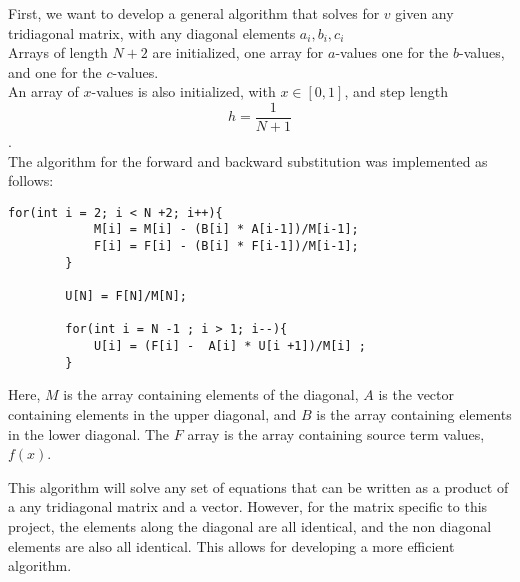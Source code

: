 \documentclass[12pt]{article}
\begin{document}
   
 First, we want to develop a general algorithm that solves for $v$ given any tridiagonal matrix, with any diagonal elements $a_i, b_i, c_i$ \\
Arrays of length $N+2$ are initialized, one array for $a$-values one for the $b$-values, and one for the $c$-values. \\

An array of $x$-values is also initialized, with $x\in[0,1]$, and step length $$h=\frac{1}{N+1}$$. \\

The algorithm for the forward and backward substitution was implemented as follows: 
 \begin{lstlisting}[frame=single]
  for(int i = 2; i < N +2; i++){
            M[i] = M[i] - (B[i] * A[i-1])/M[i-1];
            F[i] = F[i] - (B[i] * F[i-1])/M[i-1];
        }
 
        U[N] = F[N]/M[N];
 
        for(int i = N -1 ; i > 1; i--){
            U[i] = (F[i] -  A[i] * U[i +1])/M[i] ;
        }
\end{lstlisting}

Here, $M$ is the array containing elements of the diagonal, $A$ is the vector containing  elements in the upper diagonal, and $B$ is the array containing  elements in the lower diagonal. The $F$ array is the array containing source term values, $f(x)$.

This algorithm will solve any set of equations that can be written as a product of a any tridiagonal matrix and a vector. However, for the matrix specific to this project, the elements along the diagonal are all identical, and the non diagonal elements are also all identical. This allows for developing a more efficient algorithm. 

  
 
\end{document}
